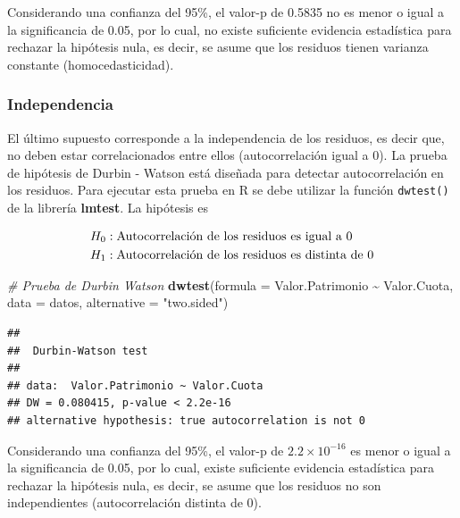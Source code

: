 \documentclass[
  11pt,
]{book}
\newenvironment{Shaded}{\begin{snugshade}}{\end{snugshade}}
\newcommand{\AttributeTok}[1]{\textcolor[rgb]{0.13,0.29,0.53}{#1}}
\newcommand{\CommentTok}[1]{\textcolor[rgb]{0.56,0.35,0.01}{\textit{#1}}}
\newcommand{\FunctionTok}[1]{\textcolor[rgb]{0.13,0.29,0.53}{\textbf{#1}}}
\newcommand{\NormalTok}[1]{#1}
\newcommand{\SpecialCharTok}[1]{\textcolor[rgb]{0.81,0.36,0.00}{\textbf{#1}}}
\newcommand{\StringTok}[1]{\textcolor[rgb]{0.31,0.60,0.02}{#1}}
\theoremstyle{definition}
\theoremstyle{definition}
\theoremstyle{definition}
\theoremstyle{definition}
\theoremstyle{remark}
\begin{document}
Considerando una confianza del 95\%, el valor-p de 0.5835 no es menor o igual a la significancia de 0.05, por lo cual, no existe suficiente evidencia estadística para rechazar la hipótesis nula, es decir, se asume que los residuos tienen varianza constante (homocedasticidad).

\subsubsection{Independencia}\label{regresion-lineal-simple-supuestos-independencia}

El último supuesto corresponde a la independencia de los residuos, es decir que, no deben estar correlacionados entre ellos (autocorrelación igual a 0). La prueba de hipótesis de Durbin - Watson está diseñada para detectar autocorrelación en los residuos. Para ejecutar esta prueba en R se debe utilizar la función \texttt{dwtest()} de la librería \textbf{lmtest}. La hipótesis es

\begin{equation}
\notag
\begin{split}
H_0&: \text{Autocorrelación de los residuos es igual a 0}\\
H_1&: \text{Autocorrelación de los residuos es distinta de 0}\\
\end{split}
\end{equation}

\begin{Shaded}
\begin{Highlighting}[]
\CommentTok{\# Prueba de Durbin Watson}
\FunctionTok{dwtest}\NormalTok{(}\AttributeTok{formula =}\NormalTok{ Valor.Patrimonio }\SpecialCharTok{\textasciitilde{}}\NormalTok{ Valor.Cuota,}
       \AttributeTok{data =}\NormalTok{ datos,}
       \AttributeTok{alternative =} \StringTok{"two.sided"}\NormalTok{)}
\end{Highlighting}
\end{Shaded}

\begin{verbatim}
## 
##  Durbin-Watson test
## 
## data:  Valor.Patrimonio ~ Valor.Cuota
## DW = 0.080415, p-value < 2.2e-16
## alternative hypothesis: true autocorrelation is not 0
\end{verbatim}

Considerando una confianza del 95\%, el valor-p de \(2.2 \times 10^{-16}\) es menor o igual a la significancia de 0.05, por lo cual, existe suficiente evidencia estadística para rechazar la hipótesis nula, es decir, se asume que los residuos no son independientes (autocorrelación distinta de 0).
\end{document}
